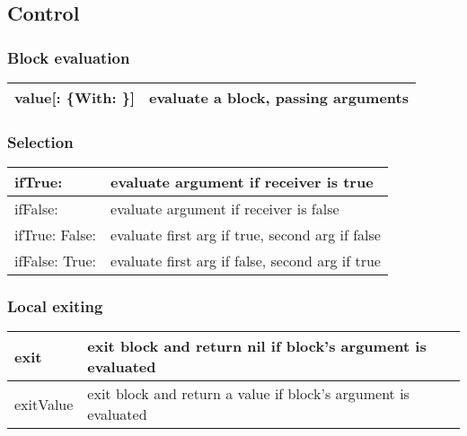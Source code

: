 \documentclass[letterpaper,10pt,english]{sphinxmanual}
\begin{document}
\subsection{Control}
\label{\detokenize{usefulselectors:control}}

\subsubsection{Block evaluation}
\label{\detokenize{usefulselectors:block-evaluation}}
\noindent\begin{tabulary}{\linewidth}{p{5cm} p{10cm}}
\hline

value{[}: \{With: \}{]}
&
evaluate a block, passing arguments
\\
\hline\end{tabulary}



\subsubsection{Selection}
\label{\detokenize{usefulselectors:selection}}
\noindent\begin{tabulary}{\linewidth}{p{5cm} p{10cm}}
\hline

ifTrue:
&
evaluate argument if receiver is true
\\
\hline
ifFalse:
&
evaluate argument if receiver is false
\\
\hline
ifTrue: False:
&
evaluate first arg if true, second arg if false
\\
\hline
ifFalse: True:
&
evaluate first arg if false, second arg if true
\\
\hline\end{tabulary}



\subsubsection{Local exiting}
\label{\detokenize{usefulselectors:local-exiting}}
\noindent\begin{tabulary}{\linewidth}{p{5cm} p{10cm}}
\hline

exit
&
exit block and return nil if block’s argument is evaluated
\\
\hline
exitValue
&
exit block and return a value if block’s argument is evaluated
\\
\hline\end{tabulary}
\end{document}
